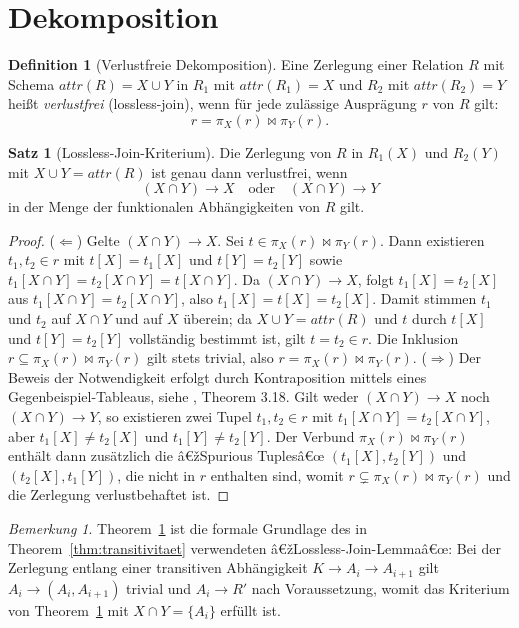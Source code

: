 ﻿\documentclass[a4paper,12pt]{report}
\theoremstyle{definition}
\newtheorem{definition}{Definition}[chapter]
\newtheorem{theorem}{Satz}[chapter]
\theoremstyle{remark}
\newtheorem{remark}{Bemerkung}[chapter]
\newcommand{\att}{\mathit{attr}}
\begin{document}
\section{Dekomposition}
\label{sec:dekomposition}

\begin{definition}[Verlustfreie Dekomposition]
\label{def:lossless}
Eine Zerlegung einer Relation $R$ mit Schema $\att(R)=X\cup Y$ in
$R_1$ mit $\att(R_1)=X$ und $R_2$ mit $\att(R_2)=Y$ heißt
\emph{verlustfrei} (lossless-join), wenn für jede zulässige
Ausprägung $r$ von $R$ gilt:
\[
  r = \pi_X(r) \Join \pi_Y(r).
\]
\end{definition}

\begin{theorem}[Lossless-Join-Kriterium]
\label{thm:lossless}
Die Zerlegung von $R$ in $R_1(X)$ und $R_2(Y)$ mit $X\cup Y=\att(R)$ ist
genau dann verlustfrei, wenn
\[
  (X\cap Y) \to X \quad\text{oder}\quad (X\cap Y) \to Y
\]
in der Menge der funktionalen Abhängigkeiten von $R$ gilt.
\end{theorem}

\begin{proof}
($\Leftarrow$) Gelte $(X\cap Y)\to X$. Sei $t \in
\pi_X(r)\Join\pi_Y(r)$. Dann existieren $t_1,t_2\in r$ mit
$t[X]=t_1[X]$ und $t[Y]=t_2[Y]$ sowie $t_1[X\cap Y]=t_2[X\cap Y]=t[X\cap
Y]$. Da $(X\cap Y)\to X$, folgt $t_1[X]=t_2[X]$ aus $t_1[X\cap
Y]=t_2[X\cap Y]$, also $t_1[X]=t[X]=t_2[X]$. Damit stimmen $t_1$ und
$t_2$ auf $X\cap Y$ und auf $X$ überein; da $X\cup Y=\att(R)$ und $t$
durch $t[X]$ und $t[Y]=t_2[Y]$ vollständig bestimmt ist, gilt $t=t_2\in
r$. Die Inklusion $r \subseteq \pi_X(r)\Join\pi_Y(r)$ gilt stets
trivial, also $r=\pi_X(r)\Join\pi_Y(r)$.
($\Rightarrow$) Der Beweis der Notwendigkeit erfolgt durch
Kontraposition mittels eines Gegenbeispiel-Tableaus, siehe
\cite{Ullman1988}, Theorem 3.18. Gilt weder $(X\cap Y)\to X$ noch
$(X\cap Y)\to Y$, so existieren zwei Tupel $t_1,t_2\in r$ mit
$t_1[X\cap Y]=t_2[X\cap Y]$, aber $t_1[X]\neq t_2[X]$ und $t_1[Y]\neq
t_2[Y]$. Der Verbund $\pi_X(r)\Join\pi_Y(r)$ enthält dann zusätzlich die
â€žSpurious Tuplesâ€œ $(t_1[X],t_2[Y])$ und $(t_2[X],t_1[Y])$, die nicht in
$r$ enthalten sind, womit $r \subsetneq \pi_X(r)\Join\pi_Y(r)$ und die
Zerlegung verlustbehaftet ist. \qedhere
\end{proof}

\begin{remark}
Theorem~\ref{thm:lossless} ist die formale Grundlage des in
Theorem~\ref{thm:transitivitaet} verwendeten
â€žLossless-Join-Lemmaâ€œ: Bei der Zerlegung entlang einer transitiven
Abhängigkeit $K\to A_i\to A_{i+1}$ gilt $A_i \to (A_i,A_{i+1})$
trivial und $A_i \to R'$ nach Voraussetzung, womit das Kriterium von
Theorem~\ref{thm:lossless} mit $X\cap Y=\{A_i\}$ erfüllt ist.
\end{remark}
\end{document}
